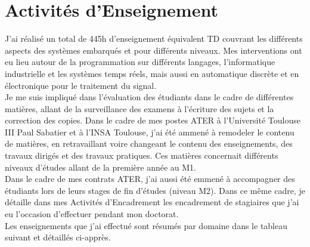 \documentclass[11pt,a4paper,sans]{moderncv}         %
\begin{document}
\section{Activit\'es d'Enseignement}\label{act-enseignement}
J'ai r\'ealis\'e un total de 445h d'enseignement \'equivalent TD couvrant les diff\'erents aspects des syst\`emes embarqu\'es et pour diff\'erents niveaux. Mes interventions ont eu lieu autour de la programmation sur diff\'erents langages, l'informatique industrielle et les syst\`emes temps r\'eels, mais aussi en automatique discr\`ete et en \'electronique pour le traitement du signal.\\
Je me suis impliqu\'e dans l'\'evaluation des \'etudiants dans le cadre de diff\'erentes mati\`eres, allant de la surveillance des examens \`a l'\'ecriture des sujets et la correction des copies. Dans le cadre de mes postes ATER \`a l'Universit\'e Toulouse III Paul Sabatier et \`a l'INSA Toulouse, j'ai \'et\'e ammen\'e \`a remodeler le contenu de mati\`eres, en retravaillant voire changeant le contenu des enseignements, des travaux dirig\'es et des travaux pratiques. Ces mati\`eres concernait diff\'erents niveaux d'\'etudes allant de la premi\`ere ann\'ee au M1.\\
Dans le cadre de mes contrats ATER, j'ai aussi \'et\'e emmen\'e \`a accompagner des \'etudiants lors de leurs stages de fin d'\'etudes (niveau M2). Dans ce m\^eme cadre, je d\'etaille dans mes Activit\'es d'Encadrement les encadrement de stagiaires que j'ai eu l'occasion d'effectuer pendant mon doctorat.\\
Les enseignements que j'ai effectu\'e sont r\'esum\'es par domaine dans le tableau suivant et d\'etaill\'es ci-appr\`es.\\
\end{document}
